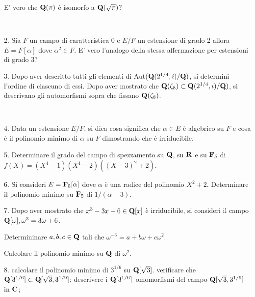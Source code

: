  E' vero che ${\bf Q}(\pi)$ \`e isomorfo a ${\bf Q}(\sqrt\pi)$?

 \medskip
 
 \bigskip\bigskip\bigskip

 \ \dotfill\ \bigskip\bigskip


 \vfil\eject

\item{2.} Sia $F$ un campo di caratteristica $0$ e $E/F$ un estensione di grado 2 allora $E=F[\alpha]$ dove $\alpha^2\in F$. E' vero l'analogo della stessa affermazione per estensioni di grado 3?\vv


\item{3.} Dopo aver descritto tutti gli elementi di Aut(${\bf Q}(2^{1/4},i)/{\bf Q})$, si determini l'ordine di ciascuno di essi. Dopo aver mostrato che ${\bf Q}(\zeta_8)\subset{\bf Q}(2^{1/4},i)/{\bf Q})$, si descrivano gli automorfismi sopra che fissano ${\bf Q}(\zeta_8)$.\vv

% 
% 


\ve\ \vs


\item{4.} Data un estensione $E/F$, si dica cosa significa che $\alpha\in E$ \`e algebrico su $F$ e cosa \`e il polinomio minimo di $\alpha$ su $F$ dimostrando che \`e irriducibile.
\vv


\item{5.} Determinare il grado del campo di spezzamento su ${\bf Q}$, su ${\bf R}$ e su ${\bf F}_5$ di $f(X)=(X^4-1)(X^4-2)((X-3)^2+2)$.
\ve\ \vs


\item{6.} Si consideri $E ={\bf F}_5[\alpha]$ dove $\alpha$ \`e una radice del polinomio $X^2 + 2$. Determinare il polinomio minimo su ${\bf F}_5$ di $1/(\alpha + 3)$.
\vv\vv

\item{7.} Dopo aver mostrato che $x^3-3x-6\in{\bf Q}[x]$ \`e irriducibile, si consideri il campo ${\bf Q}[\omega], \omega^3=3\omega+6$. 

 Determininare $a,b,c\in{\bf Q}$ tali che $\omega^{-3}=a+b\omega+c\omega^2.$ 

 Calcolare il polinomio minimo su ${\bf Q}$ di $\omega^2$. \vv\vv

\item{8.} 
 calcolare il polinomio minimo di $3^{1/6}$ su ${\bf Q}[\sqrt{3}]$.
 verificare che ${\bf Q}[3^{1/6}]\subset{\bf Q}[\sqrt{3},3^{1/9}]$; 
 descrivere i ${\bf Q}[3^{1/6}]$--omomorfismi del campo 
${\bf Q}[\sqrt{3},3^{1/9}]$ in ${\bf C}$;


\vv

\ \vst
 \bye
